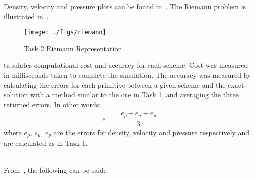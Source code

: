Density, velocity and pressure plots can be found in~. The Riemann problem is illustrated in~.
\begin{figure}[H]
    \centering
    \texttt{[image: ./figs/riemann]}
    \caption{Task 2 Riemann Representation.}\label{fig:riemann}
\end{figure}
 tabulates computational cost and accuracy for each scheme. Cost was measured in milliseconds taken to complete the simulation. The accuracy was measured by calculating the errors for each primitive between a given scheme and the exact solution with a method similar to the one in Task 1, and averaging the three returned errors. In other words:
\begin{align*}
    e &= \dfrac{e_\rho + e_u + e_p}{3}
\end{align*}
where $e_\rho$, $e_u$, $e_p$ are the errors for density, velocity and pressure respectively and are calculated as in Task 1.\\[-3mm]
\noindent\hrulefill\par
\noindent{}\\[1cm]
\noindent From~, the following can be said:
